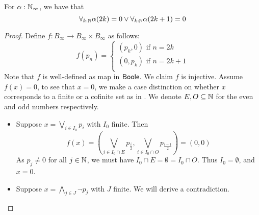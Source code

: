 \begin{theorem}\label{LLPO}
  For $\alpha:\mathbb{N}_\infty$, 
  we have that 
  \begin{equation}\label{eqnLLPO}
    \forall_{k:\mathbb{N}} \alpha(2k) = 0  \vee \forall_{k:\mathbb{N}} \alpha(2k+1) = 0
  \end{equation}
\end{theorem}
\begin{proof}
%
  Define $f:B_\infty \to B_\infty \times B_\infty$ as follows:
  \begin{equation}\label{eqnLLPOProofMap}
    f(p_n) =\begin{cases}
      (p_k,0) \text{ if } n = 2k\\
      (0,p_k) \text{ if } n = 2k+1\\
    \end{cases}
  \end{equation}
  Note that $f$ is well-defined as map in $\mathsf{Boole}$. 
  We claim $f$ is injective. Assume $f(x) = 0$, 
  to see that $x=0$, we make a case distinction on whether $x$ corresponds to a finite or a cofinite set as in .
%
  We denote $E,O\subseteq \mathbb{N}$ for the even and odd numbers respectively. 
  \begin{itemize}
    \item Suppose 
      $x = \bigvee_{i\in I_0} p_i$ with $I_0$ finite. 
      Then 
      $$f(x) = (\bigvee_{i\in I_0 \cap E } p_{\frac i2} , \bigvee_{i\in I_0 \cap O } p_{\frac {i-1}2} ) = (0,0)$$
      As $p_j\neq 0$ for all $j\in\mathbb{N}$, we must have $I_0 \cap E = \emptyset = I_0 \cap O$. 
      Thus $I_0= \emptyset$, and $x = 0$. 
    \item Suppose 
      $x = \bigwedge_{j\in J} \neg p_j$ with $J$ finite. %
      We will derive a contradiction. %

\end{itemize}
\end{proof}
